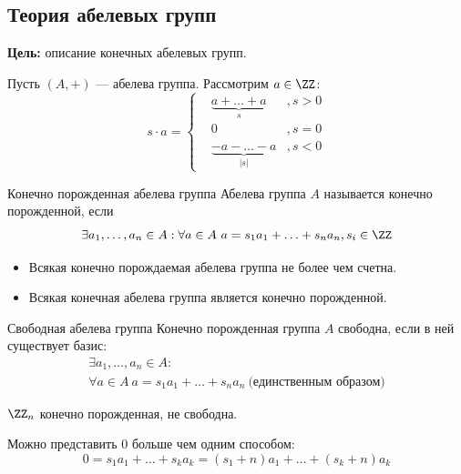 \subsection{Теория абелевых групп}

\textbf{Цель:}
описание конечных абелевых групп.

\begin{defn}{}{}
    Пусть \( (A, +) \) --- абелева группа. Рассмотрим \( a \in \ZZ \):
    \[
        s \cdot a = \left\{
            \begin{aligned}    
                & \underbrace{a + \ldots + a}_{s} &, s > 0
                \\
                & 0 &, s = 0
                \\
                & \underbrace{ - a - \ldots - a}_{|s|} &, s < 0
            \end{aligned}
        \right.
    \]
\end{defn}

\begin{defn}{Конечно порожденная абелева группа}{}
    Абелева группа \( A \) называется конечно порожденной,
    если
    \[
        \exists a_1, \ldots, a_n \in A : \forall a \in A \ a = s_1 a_1 + \ldots + s_n a_n, s_i \in \ZZ
    \]
\end{defn}

\begin{remark}{}{}
    \begin{itemize}
        \item
            Всякая конечно порождаемая абелева группа не более чем счетна.
        \item
            Всякая конечная абелева группа является конечно порожденной.
    \end{itemize}
\end{remark}

\begin{defn}{Свободная абелева группа}{}
    Конечно порожденная группа \( A \) свободна,
    если в ней существует базис:
    \begin{gather*}
        \exists a_1, \ldots, a_n \in A :
        \\
        \forall a \in A \ a = s_1 a_1 + \ldots + s_n a_n \ \text{(единственным образом)}
    \end{gather*}
\end{defn}

\begin{example}{}{}
    \( \ZZ_n \) конечно порожденная, не свободна.

    Можно представить \( 0 \) больше чем одним способом:
    \[
        0 = s_1 a_1 + \ldots + s_k a_k = (s_1 + n) a_1 + \ldots + (s_k + n) a_k
    \]
\end{example}

